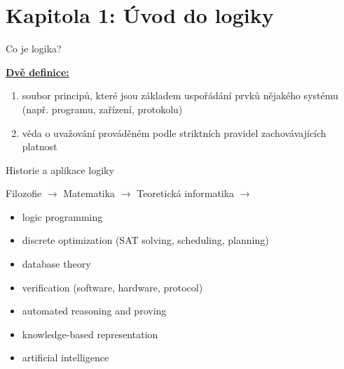 \documentclass{beamer}
\begin{document}
\section{\sc Kapitola 1: Úvod do logiky}


\begin{frame}{Co je logika?}

    
    \href{https://www.google.com/search?q=define+logic}{\textbf{Dvě definice:}}
        \begin{enumerate}
            \item soubor principů, které jsou základem uspořádání prvků nějakého systému (např. programu, zařízení, protokolu)
            \item věda o uvažování prováděném podle striktních pravidel zachovávajících platnost 
        \end{enumerate}
        
    \medskip 
    
    \pause


\end{frame}


\begin{frame}{Historie a aplikace logiky}

    {\footnotesize Filozofie $\to$}  {\normalsize Matematika $\to$}  {\Large Teoretická informatika $\to$} 
    
    \medskip
    

    \pause

    \medskip

    \begin{itemize}
        \item logic programming
        \item discrete optimization (SAT solving, scheduling, planning)
        \item database theory
        \item verification (software, hardware, protocol)
        \item automated reasoning and proving
        \item knowledge-based representation
        \item artificial intelligence
    \end{itemize}

\end{frame}
\end{document}
